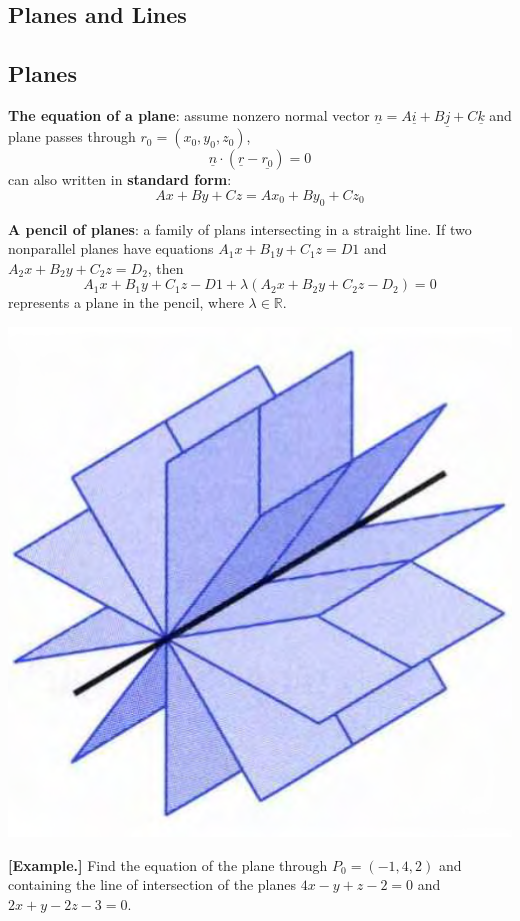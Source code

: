 \documentclass[11pt, a4paper]{MATH2023}
\newcommand{\eg}{\textbf{[Example.] }}
\newcommand{\vct}{\underline}
\newcommand{\ii}{\underline{i}}
\newcommand{\kk}{\underline{k}}
\newcommand{\jj}{\underline{j}}
\begin{document}
\begin{spacing}{1.3}
    \section{Planes and Lines}

    \subsection{Planes}

    {\bf The equation of a plane}: assume nonzero normal vector 
    $\vct{n}=A\ii+B\jj+C\kk$ and plane passes through $r_0=(x_0,y_0,z_0)$,
    $$\vct{n}\cdot (\vct{r}-\vct{r_0})=0$$
    can also written in {\bf standard form}: 
    $$Ax+By+Cz=Ax_0+By_0+Cz_0$$

    {\bf A pencil of planes}: a family of plans intersecting in a straight line.
    If two nonparallel planes have equations $A_1x+B_1y+C_1z=D1$ and 
    $A_2x+B_2y+C_2z=D_2$, then 
    $$A_1x+B_1y+C_1z-D1+\lambda(A_2x+B_2y+C_2z-D_2)=0$$
    represents a plane in the pencil, where $\lambda\in \mathbb{R}$.
    \begin{center}
        \includegraphics[scale=0.4]{images/Ch10-pencils-of-planes.png}
    \end{center}

    \eg Find the equation of the plane through $P_0=(-1,4,2)$ and 
    containing the line of intersection of the planes 
    $4x-y+z-2=0$ and $2x+y-2z-3=0$.


\end{spacing}
\end{document}
